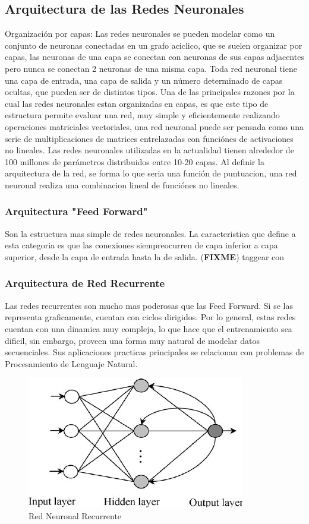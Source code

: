 \documentclass[a4paper,11pt,spanish]{book}
\newcommand*{\FIXME}[1]{{(\textbf{FIXME}) {#1}}}
\begin{document}
    \subsection {Arquitectura de las Redes Neuronales}
      Organización por capas: Las redes neuronales se pueden modelar como un conjunto de neuronas conectadas en un grafo aciclico, que se suelen organizar por capas, las neuronas de una capa
      se conectan con neuronas de sus capas adjacentes pero nunca se conectan 2 neuronas de una misma capa.
      Toda red neuronal tiene una capa de entrada, una capa de salida y un número determinado de capas ocultas, que pueden ser de distintos tipos.
      Una de las principales razones por la cual las redes neuronales estan organizadas en capas, es que este tipo de estructura permite evaluar una red, muy simple y eficientemente realizando
      operaciones matriciales vectoriales, una red neuronal puede ser pensada como una serie de multiplicaciones de matrices entrelazadas con funciónes de activaciones no lineales.
      Las redes neuronales utilizadas en la actualidad tienen alrededor de 100 millones de parámetros distribuidos entre 10-20 capas.
      Al definir la arquitectura de la red, se forma lo que seria una función de puntuacion, una red neuronal realiza una combinacion lineal de funciónes no lineales.

      \subsubsection {Arquitectura "Feed Forward"}
	Son la estructura mas simple de redes neuronales. La caracteristica que define a esta categoria es que las conexiones siempreocurren de capa inferior a capa superior,
	desde la capa de entrada hasta la de salida.
	\FIXME{taggear con \label{fig:neural_network} }
      \subsubsection {Arquitectura de Red Recurrente}
	Las redes recurrentes son mucho mas poderosas que las Feed Forward. Si se las representa graficamente, cuentan con ciclos dirigidos. Por lo general, estas redes cuentan
	con una dinamica muy compleja, lo que hace que el entrenamiento sea dificil, sin embargo, proveen una forma muy natural de modelar datos secuenciales. Sus aplicaciones practicas
	principales se relacionan con problemas de Procesamiento de Lenguaje Natural.
	\begin{figure}[H]
	  \includegraphics[scale=0.5]{./img/rnn.png}
	  \caption{Red Neuronal Recurrente}
	  \label{fig:rnn}
	\end{figure}
\end{document}
